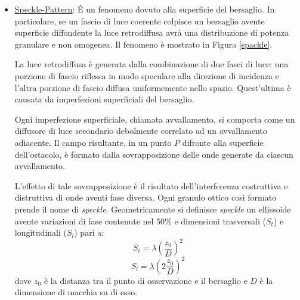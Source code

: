 \begin{itemize}
		Dalle precedenti relazioni è possibile ricavare la distanza massima dell'ostacolo affinché non si perda la proprietà di coerenza:
		\begin{equation}
			s_{max}=|s_m - s_r|_{max}=\frac{c}{\Delta \nu} = L_{coh}
		\end{equation}
		Se la distanza dell'ostacolo è maggiore di $L_{coh}$ non si ha segnale interferometrico ma solo rumore dunque non è possibile effettuare misure valide non potendo contare correttamente le frange interferometriche. Questo rumore è definito come rumore di fase. Solitamente il rumore di fase è il contributo dominante nella determinazione del minimo spostamento misurabile. 
		
		Tuttavia esiste un altro contributo che limita le prestazioni: il rumore quantico. Tale rumore risulta essere quasi sempre trascurabile perché il rumore di fase è dominante rispetto ad esso.
		\item \underline{Speckle-Pattern}: \'E un fenomeno dovuto alla superficie del bersaglio. In particolare, se un fascio di luce coerente colpisce un bersaglio avente superficie diffondente la luce retrodiffusa avrà una distribuzione di potenza granulare e non omogenea. Il fenomeno è mostrato in Figura \ref{spackle}.
		
			La luce retrodiffusa è generata dalla combinazione di due fasci di luce: una porzione di fascio riflessa in modo speculare alla direzione di incidenza e l'altra porzione di fascio diffusa uniformemente nello spazio. Quest'ultima è causata da imperfezioni superficiali del bersaglio.
			
			Ogni imperfezione superficiale, chiamata avvallamento, si comporta come un diffusore di luce secondario debolmente correlato ad un avvallamento adiacente. Il campo risultante, in un punto $P$ difronte alla superficie dell'ostacolo, è formato dalla sovrapposizione delle onde generate da ciascun avvallamento.
			
			 L'effetto di tale sovrapposizione è il risultato dell'interferenza costruttiva e distruttiva di onde aventi fase diversa. Ogni granulo ottico così formato prende il nome di \textit{speckle}. Geometricamente si definisce \textit{speckle} un ellissoide avente variazioni di fase contenute nel $50\%$ e dimensioni trasversali ($S_t$) e longitudinali ($S_l$) pari a:
			 \begin{equation}
			 	S_t=\lambda \left ( \frac{z_0}{D} \right )^2
			 \end{equation}
			 \begin{equation}
			 	S_l=\lambda \left ( 2 \frac{z_0}{D} \right )^2
			 \end{equation}
			 dove $z_0$ è la distanza tra il punto di osservazione e il bersaglio e $D$ è la dimensione di macchia su di esso.
			 

\end{itemize}

